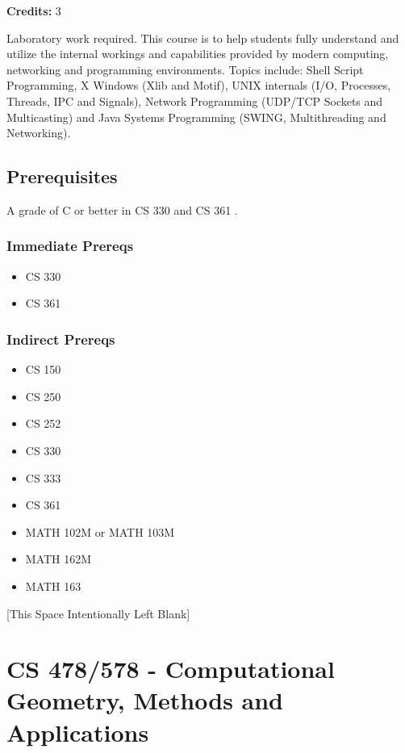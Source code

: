 \documentclass[]{article}
\providecommand{\tightlist}{%
  \setlength{\itemsep}{0pt}\setlength{\parskip}{0pt}}
\newcommand{\pagebreakhere}{
\vspace*{\fill}
\begin{center}
[This Space Intentionally Left Blank]
\end{center}
\vspace*{\fill}
\newpage
}
\begin{document}
\textbf{Credits:} 3

Laboratory work required. This course is to help students fully
understand and utilize the internal workings and capabilities provided
by modern computing, networking and programming environments. Topics
include: Shell Script Programming, X Windows (Xlib and Motif), UNIX
internals (I/O, Processes, Threads, IPC and Signals), Network
Programming (UDP/TCP Sockets and Multicasting) and Java Systems
Programming (SWING, Multithreading and Networking).

\subsection{Prerequisites}\label{prerequisites-46}

A grade of C or better in CS 330 and CS 361 .

\subsubsection{Immediate Prereqs}\label{immediate-prereqs-37}

\begin{itemize}
\tightlist
\item
  CS 330
\item
  CS 361
\end{itemize}

\subsubsection{Indirect Prereqs}\label{indirect-prereqs-37}

\begin{itemize}
\tightlist
\item
  CS 150
\item
  CS 250
\item
  CS 252
\item
  CS 330
\item
  CS 333
\item
  CS 361
\item
  MATH 102M or MATH 103M
\item
  MATH 162M
\item
  MATH 163
\end{itemize}

\pagebreakhere
\section{CS 478/578 - Computational Geometry, Methods and
Applications}\label{cs-478578---computational-geometry-methods-and-applications}
\end{document}
